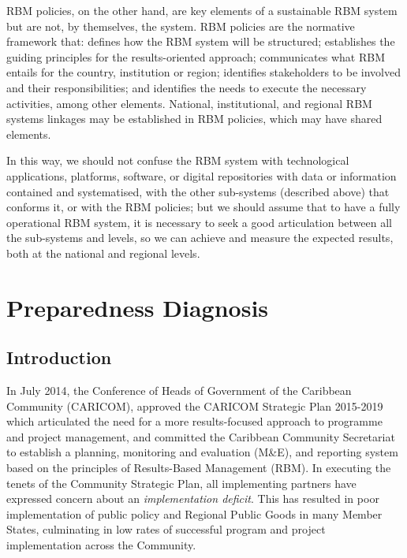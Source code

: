 \documentclass[
]{book}
\begin{document}
RBM policies, on the other hand, are key elements of a sustainable RBM system but are not, by themselves, the system. RBM policies are the normative framework that: defines how the RBM system will be structured; establishes the guiding principles for the results-oriented approach; communicates what RBM entails for the country, institution or region; identifies stakeholders to be involved and their responsibilities; and identifies the needs to execute the necessary activities, among other elements. National, institutional, and regional RBM systems linkages may be established in RBM policies, which may have shared elements.

In this way, we should not confuse the RBM system with technological applications, platforms, software, or digital repositories with data or information contained and systematised, with the other sub-systems (described above) that conforms it, or with the RBM policies; but we should assume that to have a fully operational RBM system, it is necessary to seek a good articulation between all the sub-systems and levels, so we can achieve and measure the expected results, both at the national and regional levels.

\hypertarget{part-preparedness-diagnosis}{%
\part{Preparedness Diagnosis}\label{part-preparedness-diagnosis}}

\hypertarget{introduction}{%
\chapter{Introduction}\label{introduction}}

In July 2014, the Conference of Heads of Government of the Caribbean Community (CARICOM), approved the CARICOM Strategic Plan 2015-2019 which articulated the need for a more results-focused approach to programme and project management, and committed the Caribbean Community Secretariat to establish a planning, monitoring and evaluation (M\&E), and reporting system based on the principles of Results-Based Management (RBM). In executing the tenets of the Community Strategic Plan, all implementing partners have expressed concern about an \emph{implementation deficit}. This has resulted in poor implementation of public policy and Regional Public Goods in many Member States, culminating in low rates of successful program and project implementation across the Community.
\end{document}
